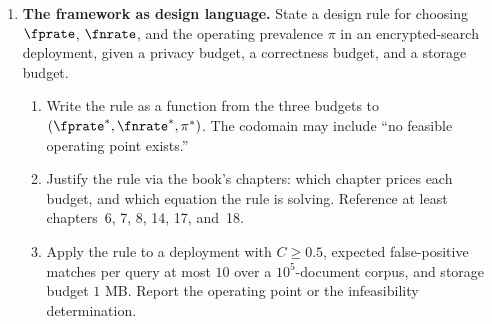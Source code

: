 \begin{enumerate}
\item \exstarstarstar
\label{ex:ch18-11}
\textbf{The framework as design language.}
State a design rule for choosing $\fprate$, $\fnrate$, and the
operating prevalence $\pi$ in an encrypted-search deployment,
given a privacy budget, a correctness budget, and a storage
budget.
\begin{enumerate}
  \item[(a)] Write the rule as a function from the three
    budgets to $(\fprate^*, \fnrate^*, \pi^*)$. The codomain
    may include ``no feasible operating point exists.''
  \item[(b)] Justify the rule via the book's chapters: which
    chapter prices each budget, and which equation the rule
    is solving. Reference at least chapters~6, 7, 8, 14, 17,
    and~18.
  \item[(c)] Apply the rule to a deployment with $C \ge 0.5$,
    expected false-positive matches per query at most $10$
    over a $10^5$-document corpus, and storage budget $1$ MB.
    Report the operating point or the infeasibility
    determination.
\end{enumerate}

\end{enumerate}
